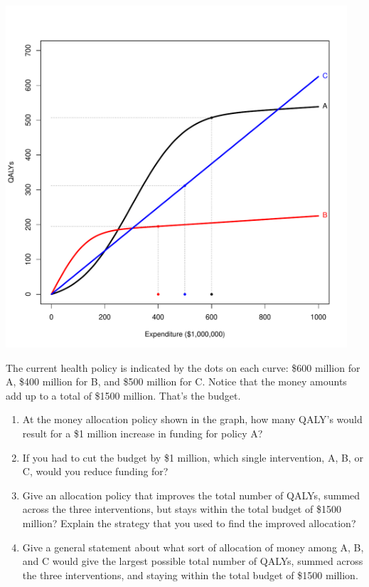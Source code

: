 \centerline{\includegraphics[width=5in]{Figures/tradeoffs-qaly1}}

The current health policy is indicated by the dots on each curve:
\$600 million for A, \$400 million for B, and \$500 million for C.
Notice that the money amounts add up to a total of \$1500 million.
That's the budget.

\newpage
\begin{enumerate}

\item At the money allocation policy shown in the graph, how many QALY's would
result for a \$1 million increase in funding for policy A?

\answerSpace{1in}


\item If you had to cut the budget by \$1 million, which single intervention, A,
  B, or C,  would you reduce funding for?

\answerSpace{1in}

\item Give an allocation policy that improves the total number of QALYs, summed
across the three interventions, but stays within the total budget of
\$1500 million?  Explain the strategy that you used to find
the improved allocation?

\answerSpace{1.3in}

\item Give a general statement about what sort of allocation of money
  among A, B, and C would give the largest possible total number of
  QALYs, summed across the three interventions, and staying within the
  total budget of \$1500 million.

\answerSpace{1.3in}

\end{enumerate}
